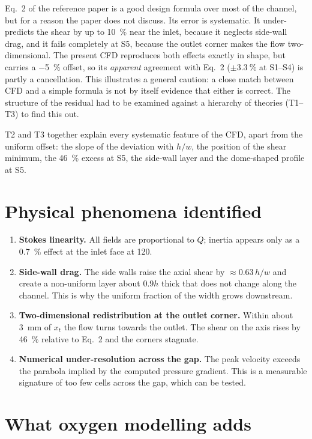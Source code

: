 Eq.~2 of the reference paper is a good design formula over most of the channel, but for a reason the paper does not discuss. Its error is systematic. It under-predicts the shear by up to \SI{10}{\percent} near the inlet, because it neglects side-wall drag, and it fails completely at S5, because the outlet corner makes the flow two-dimensional. The present CFD reproduces both effects exactly in shape, but carries a \SI{-5}{\percent} offset, so its \emph{apparent} agreement with Eq.~2 ($\pm\SI{3.3}{\percent}$ at S1--S4) is partly a cancellation. This illustrates a general caution: a close match between CFD and a simple formula is not by itself evidence that either is correct. The structure of the residual had to be examined against a hierarchy of theories (T1--T3) to find this out.

T2 and T3 together explain every systematic feature of the CFD, apart from the uniform offset: the slope of the deviation with $h/w$, the position of the shear minimum, the \SI{46}{\percent} excess at S5, the side-wall layer and the dome-shaped profile at S5.

\section{Physical phenomena identified}

\begin{enumerate}
\item \textbf{Stokes linearity.} All fields are proportional to $Q$; inertia appears only as a \SI{0.7}{\percent} effect at the inlet face at \SI{120}{\uLmin}.
\item \textbf{Side-wall drag.} The side walls raise the axial shear by $\approx0.63\,h/w$ and create a non-uniform layer about $0.9h$ thick that does not change along the channel. This is why the uniform fraction of the width grows downstream.
\item \textbf{Two-dimensional redistribution at the outlet corner.} Within about \SI{3}{mm} of $x_t$ the flow turns towards the outlet. The shear on the axis rises by \SI{46}{\percent} relative to Eq.~2 and the corners stagnate.
\item \textbf{Numerical under-resolution across the gap.} The peak velocity exceeds the parabola implied by the computed pressure gradient. This is a measurable signature of too few cells across the gap, which can be tested.
\end{enumerate}

\section{What oxygen modelling adds}

